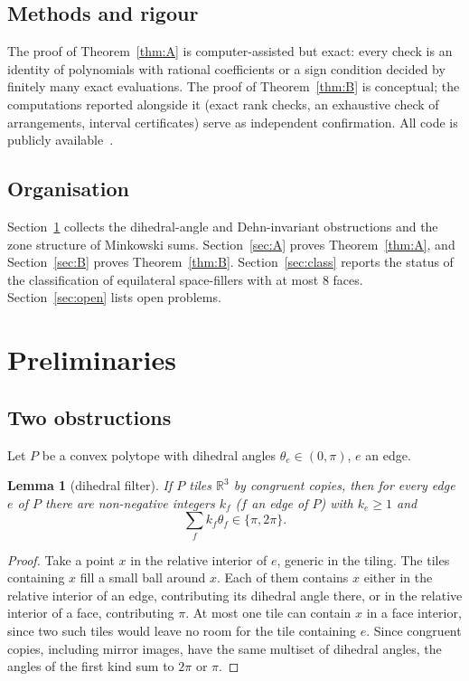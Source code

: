 \documentclass[11pt]{amsart}
\newtheorem{lemma}[thm]{Lemma}
\theoremstyle{definition}
\newcommand{\R}{\mathbb{R}}
\begin{document}
\subsection*{Methods and rigour}
The proof of Theorem~\ref{thm:A} is computer-assisted but exact: every check is an identity of
polynomials with rational coefficients or a sign condition decided by finitely many exact evaluations. The proof
of Theorem~\ref{thm:B} is conceptual; the computations reported alongside it (exact rank checks,
an exhaustive check of arrangements, interval certificates) serve as independent confirmation. All code is publicly available~\cite{code}.

\subsection*{Organisation}
Section~\ref{sec:prelim} collects the dihedral-angle and Dehn-invariant obstructions and the zone structure of
Minkowski sums. Section~\ref{sec:A} proves Theorem~\ref{thm:A}, and Section~\ref{sec:B} proves Theorem~\ref{thm:B}.
Section~\ref{sec:class} reports the status of the classification of equilateral space-fillers with at most $8$
faces. Section~\ref{sec:open} lists open problems.

\section{Preliminaries}\label{sec:prelim}

\subsection{Two obstructions}
Let $P$ be a convex polytope with dihedral angles $\theta_e\in(0,\pi)$, $e$ an edge.

\begin{lemma}[dihedral filter]\label{lem:filter}
If $P$ tiles $\R^3$ by congruent copies, then for every edge $e$ of $P$ there are non-negative integers $k_f$ ($f$
an edge of $P$) with $k_e\ge1$ and
\[ \sum_f k_f\theta_f \in\{\pi, 2\pi\}. \]
\end{lemma}
\begin{proof}
Take a point $x$ in the relative interior of $e$, generic in the tiling. The tiles containing $x$ fill a small
ball around $x$. Each of them contains $x$ either in the relative interior of an edge, contributing its dihedral
angle there, or in the relative interior of a face, contributing $\pi$. At most one tile can contain $x$ in a
face interior, since two such tiles would leave no room for the tile containing $e$. Since congruent copies, including
mirror images, have the same multiset of dihedral angles, the angles of the first kind sum to $2\pi$ or $\pi$.
\end{proof}
\end{document}
